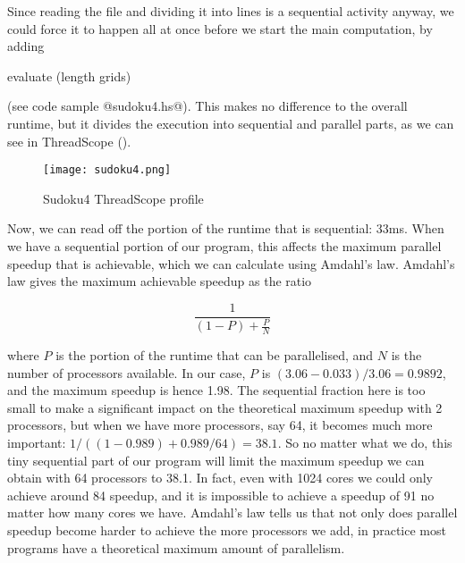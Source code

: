 Since reading the file and dividing it into lines is a sequential
activity anyway, we could force it to happen all at once before we
start the main computation, by adding

\begin{haskell}
    evaluate (length grids)
\end{haskell}

\noindent (see code sample @sudoku4.hs@).  This makes no difference to
the overall runtime, but it divides the execution into sequential and
parallel parts, as we can see in ThreadScope
().

\begin{figure}
\begin{center}
\texttt{[image: sudoku4.png]}
\end{center}
\caption{Sudoku4 ThreadScope profile}
\label{fig:sudoku4-threadscope}
\end{figure}

Now, we can read off the portion of the runtime that is sequential:
33ms.  When we have a sequential portion of our program, this affects
the maximum parallel speedup that is achievable, which we can
calculate using Amdahl's law.  Amdahl's law gives the maximum
achievable speedup as the ratio

\[
  \frac{1}{(1 - P) + \frac{P}{N}}
\]

\noindent where $P$ is the portion of the runtime that can be
parallelised, and $N$ is the number of processors available.  In our
case, $P$ is $(3.06-0.033)/3.06 = 0.9892$, and the maximum speedup is
hence 1.98.  The sequential fraction here is too small to make a
significant impact on the theoretical maximum speedup with 2
processors, but when we have more processors, say 64, it becomes much
more important: $1 / ((1-0.989) + 0.989/64) = 38.1$.  So no matter
what we do, this tiny sequential part of our program will limit the
maximum speedup we can obtain with 64 processors to 38.1.  In fact,
even with 1024 cores we could only achieve around 84 speedup, and it
is impossible to achieve a speedup of 91 no matter how many cores we
have.  Amdahl's law tells us that not only does parallel speedup
become harder to achieve the more processors we add, in practice most
programs have a theoretical maximum amount of parallelism.



